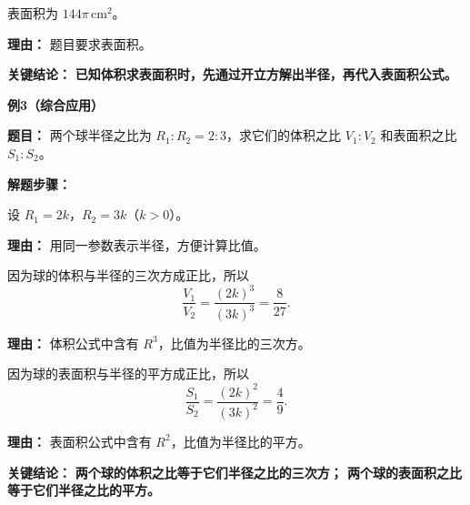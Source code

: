 \begin{examplebox}
\begin{description}[style=nextline, leftmargin=2.8em, labelsep=0.5em, itemsep=0.45em]
\item[\textbf{第三步（给出答案）：}] 表面积为 $144\pi\,\mathrm{cm}^{2}$。
\par\textbf{理由：} 题目要求表面积。
\end{description}

\textbf{\textcolor{CExample}{关键结论：}} \textbf{已知体积求表面积时，先通过开立方解出半径，再代入表面积公式。}

\medskip
\textbf{\textcolor{CExample}{例3（综合应用）}}

\textbf{\textcolor{CExample}{题目：}} 两个球半径之比为 $R_1 : R_2 = 2 : 3$，求它们的体积之比 $V_1 : V_2$ 和表面积之比 $S_1 : S_2$。

\textbf{\textcolor{CExample}{解题步骤：}}
\begin{description}[style=nextline, leftmargin=2.8em, labelsep=0.5em, itemsep=0.45em]
\item[\textbf{第一步（设比例参数）：}] 设 $R_1 = 2k$，$R_2 = 3k$（$k>0$）。
\par\textbf{理由：} 用同一参数表示半径，方便计算比值。

\item[\textbf{第二步（求体积之比）：}] 因为球的体积与半径的三次方成正比，所以
\[
\frac{V_1}{V_2}=\frac{(2k)^{3}}{(3k)^{3}}=\frac{8}{27}.
\]
\par\textbf{理由：} 体积公式中含有 $R^{3}$，比值为半径比的三次方。

\item[\textbf{第三步（求表面积之比）：}] 因为球的表面积与半径的平方成正比，所以
\[
\frac{S_1}{S_2}=\frac{(2k)^{2}}{(3k)^{2}}=\frac{4}{9}.
\]
\par\textbf{理由：} 表面积公式中含有 $R^{2}$，比值为半径比的平方。
\end{description}

\textbf{\textcolor{CExample}{关键结论：}} \textbf{两个球的体积之比等于它们半径之比的三次方；
两个球的表面积之比等于它们半径之比的平方。}
\end{examplebox}